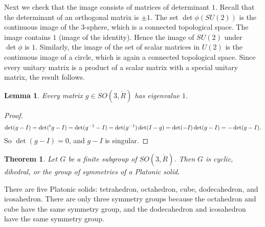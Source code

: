 \documentclass{amsart}
\newtheorem{theorem}[equation]{Theorem}
\newtheorem{lemma}[equation]{Lemma}
\def\t#1{\hbox{}^t#1}
\begin{document}
Next we check that the image consists of matrices of determinant $1$.
Recall that the determinant of an orthogonal matrix is $\pm 1$.
The set $\det\phi(SU(2))$ is the continuous image of the $3$-sphere, which is a connected topological space.  The
image contains $1$ (image of the identity).  Hence the image of $SU(2)$ under $\det\phi$ is $1$.  Similarly,
the image of the set of scalar matrices in $U(2)$ is the continuous image of a circle, which is again a connected
topological space.  Since every unitary matrix is a product of a scalar matrix with a special unitary matrix,
the result follows.

\begin{lemma} Every matrix $g\in SO(3,\ring{R})$ has  eigenvalue $1$.
\end{lemma}

\begin{proof}
\[
\det (g-I) = \det(\t{g}-I) = \det(g^{-1}-I) = \det(g^{-1})\det(I - g) = 
\det(-I)\det(g - I) = -\det(g-I).
\]
So $\det(g-I)=0$, and $g-I$ is singular.
\end{proof}

\begin{theorem}
Let $G$ be a finite subgroup of $SO(3,\ring{R})$.  Then $G$ is cyclic, dihedral,
or the group of symmetries of a Platonic solid.
\end{theorem}

There are five Platonic solids: tetrahedron, octahedron, cube, dodecahedron, and icosahedron.
There are only three symmetry groups because the octahedron and cube have the same symmetry group,
and the dodecahedron and icosahedron have the same symmetry group.
\end{document}
